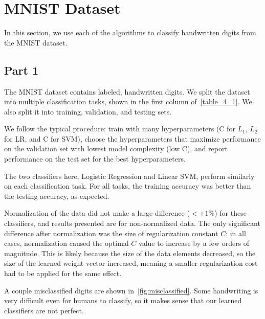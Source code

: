 \section{MNIST Dataset} \label{sec:prob4}
In this section, we use each of the algorithms to classify handwritten digits from the MNIST dataset.

\subsection{Part 1}
The MNIST dataset contains labeled, handwritten digits.
We split the dataset into multiple classification tasks, shown in the first column of~\cref{table_4_1}.
We also split it into training, validation, and testing sets.

We follow the typical procedure: train with many hyperparameters (C for $L_1$, $L_2$ for LR, and C for SVM), choose the hyperparameters that maximize performance on the validation set with lowest model complexity (low C), and report performance on the test set for the best hyperparameters.

The two classifiers here, Logistic Regression and Linear SVM, perform similarly on each classification task.
For all tasks, the training accuracy was better than the testing accuracy, as expected.

Normalization of the data did not make a large difference ($<\pm 1\%$) for these classifiers, and results presented are for non-normalized data.
The only significant difference after normalization was the size of regularization constant $C$; in all cases, normalization caused the optimal $C$ value to increase by a few orders of magnitude.
This is likely because the size of the data elements decreased, so the size of the learned weight vector increased, meaning a smaller regularization cost had to be applied for the same effect.

A couple misclassified digits are shown in~\cref{fig:misclassified}.
Some handwriting is very difficult even for humans to classify, so it makes sense that our learned classifiers are not perfect.

